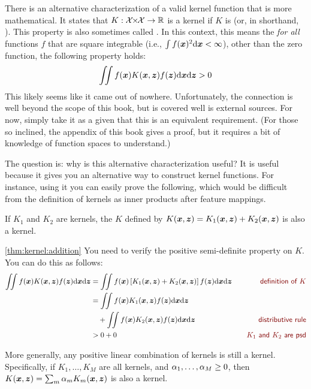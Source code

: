 There is an alternative characterization of a valid kernel function
that is more mathematical.  It states that $K : \cX \times \cX \fto
\R$ is a kernel if $K$ is  (or, in
shorthand, ).  This property is also sometimes called
.  In this context, this means the
\emph{for all} functions $f$ that are square integrable (i.e., $\int
f({\boldsymbol{x}})^2 \textrm{d}{\boldsymbol{x}} < \infty$), other than the zero function, the
following property holds:
%
\begin{align}
\int\!\!\!\int f({\boldsymbol{x}}) K({\boldsymbol{x}},{\boldsymbol{z}}) f({\boldsymbol{z}}) \textrm{d} {\boldsymbol{x}} \textrm{d} {\boldsymbol{z}} > 0
\end{align}
%
This likely seems like it came out of nowhere.  Unfortunately, the
connection is well beyond the scope of this book, but is covered well
is external sources.  For now, simply take it as a given that this is
an equivalent requirement.  (For those so inclined, the appendix of
this book gives a proof, but it requires a bit of knowledge of
function spaces to understand.)

The question is: why is this alternative characterization useful?  It
is useful because it gives you an alternative way to construct kernel
functions.  For instance, using it you can easily prove the following,
which would be difficult from the definition of kernels as inner
products after feature mappings.
%
\begin{theorem} \label{thm:kernel:addition}
  If $K_1$ and $K_2$ are kernels, the $K$ defined by $K({\boldsymbol{x}},{\boldsymbol{z}}) =
  K_1({\boldsymbol{x}},{\boldsymbol{z}}) + K_2({\boldsymbol{x}},{\boldsymbol{z}})$ is also a kernel.
\end{theorem}
\begin{myproof}{\ref{thm:kernel:addition}}
You need to verify the positive semi-definite property on $K$.  You
can do this as follows:
%
\begin{align}
\int\!\!\!\int f(\vx) K(\vx,\vz) f(\vz) \ud \vx \ud \vz 
&= \int\!\!\!\int f(\vx) \left[ K_1(\vx,\vz) + K_2(\vx,\vz) \right] f(\vz) \ud \vx \ud \vz 
   \becauseof{definition of $K$}\\
&= \int\!\!\!\int f(\vx) K_1(\vx,\vz) f(\vz) \ud \vx \ud \vz \nonumber\\
&\quad + \int\!\!\!\int f(\vx) K_2(\vx,\vz) f(\vz) \ud \vx \ud \vz 
  \becauseof{distributive rule}\\
&> 0 + 0
   \becauseof{$K_1$ and $K_2$ are psd}
\end{align}
\end{myproof}

More generally, any positive linear combination of kernels is still a
kernel.  Specifically, if $K_1, \dots, K_M$ are all kernels, and
$\alpha_1, \dots, \alpha_M \geq 0$, then $K({\boldsymbol{x}},{\boldsymbol{z}}) = \sum_m \alpha_m
K_m({\boldsymbol{x}},{\boldsymbol{z}})$ is also a kernel.

